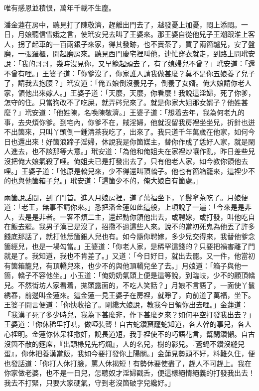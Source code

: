 \begin{myquote}
唯有感恩並積恨，萬年千載不生塵。
\end{myquote}

潘金蓮在房中，聽見打了陳敬濟，趕離出門去了，越發憂上加憂，悶上添悶。一日，月娘聽信雪娥之言，使玳安兒去叫了王婆來。那王婆自從他兒子王潮跟淮上客人，拐了起車的一百兩銀子來家，得其發跡，也不賣茶了，買了兩箇驢兒，安了盤磨，一張羅櫃，開起磨房來。聽見西門慶宅裡叫他，連忙穿衣就走，到路上問玳安說：「我的哥哥，幾時沒見你，又早籠起頭去了，有了媳婦兒不曾？」玳安道：「還不曾有哩。」王婆子道：「你爹沒了，你家誰人請我做甚麼？莫不是你五娘養了兒子了，請我去抱腰？」玳安道：「俺五娘倒沒養兒子，倒養了女婿。{}俺大娘請你老人家，領他出來嫁人。」王婆子道：「天麼，天麼，你看麼！我說這淫婦，死了你爹，怎守的住。只當狗改不了吃屎，{}就弄硶兒來了。就是你家大姐那女婿子？他姓甚麼？」{}玳安道：「他姓陳，名喚陳敬濟。」王婆子道：「想着去年，我為何老九的事，去央煩你爹。到宅內，你爹不在，賊淫婦，他就沒留我房裡坐坐兒，折針也迸不出箇來，{}只叫丫頭倒一鍾清茶我吃了，出來了。我只道千年萬歲在他家，如何今日也還出來！好箇浪蹄子淫婦，休說我是你箇媒主，替你作成了恁好人家，就是閑人進去，也不該那等大意。」玳安道：「為他和俺姐夫在家裡炒嚷作亂，昨日差些兒沒把俺大娘氣殺了哩。俺姐夫已是打發出去了，只有他老人家，如今教你領他去哩。」王婆子道：「他原是轎兒來，少不得還叫頂轎子。他也有箇箱籠來，這裡少不的也與他箇箱子兒。」玳安道：「這箇少不的，俺大娘自有箇處。」

兩箇說話間，到了門首。進入月娘房裡，道了萬福坐下，丫鬟拿茶吃了。月娘便道：「老王，無事不請你來。」悉把潘金蓮如此這般，上項說了一遍：「今來是是非人，去是是非者。一客不煩二主，還起動你領他出去，或聘嫁，或打發，叫他吃自在飯去罷。我男子漢已是沒了，招攬不過這些人來。說不的當初死鬼為他丟了許多錢底那話了，就打他恁箇銀人兒也有。{}如今隨你聘嫁，多少兒交得來，我替他爹念箇經兒，也是一場勾當。」王婆道：「你老人家，是稀罕這錢的？只要把禍害離了門就是了。{}我知道，我也不肯差了。」又道：「今日好日，就出去罷。又一件，他當初有箇箱籠兒，有頂轎兒來，也少不的與他頂轎兒坐了去。」月娘道：「箱子與他一箇，轎子不容他坐。」小玉道：「俺奶奶氣頭上便是這等說，到臨岐，少不的顧頂轎兒。不然街坊人家看着，拋頭露面的，不吃人笑話？」月娘不言語了，一面使丫鬟綉春，前邊叫金蓮來。{}這金蓮一見王婆子在房裡，就睜了，向前道了萬福，坐下。王婆子開言便道：「你快收拾了。剛纔大娘說，教我今日領你出去哩。」金蓮道：「我漢子死了多少時兒，我為下甚麼非，作下甚麼歹來？如何平空打發我出去？」王婆道：「你休稀里打哄，做啞裝聾！自古蛇鑽窟窿蛇知道，各人幹的事兒，各人心裡明。金蓮你休呆裡撒奸，說長道短，我手裡使不的巧語花言，幫閑鑽懶。自古沒箇不散的筵席，『出頭椽兒先朽爛』，人的名兒，樹的影兒。『蒼蠅不鑽沒縫兒蛋』，你休把養漢當飯，我如今要打發你上陽關。」{}金蓮見勢頭不好，料難久住，便也發話道：「你打人休打臉，罵人休揭短！有勢休要使盡了，趕人不可趕上。我在你家做老婆，也不是一日兒，怎聽奴才淫婦戳舌，便這樣絕情絕義的打發我出去！我去不打緊，只要大家硬氣，守到老沒箇破字兒纔好。」{}

